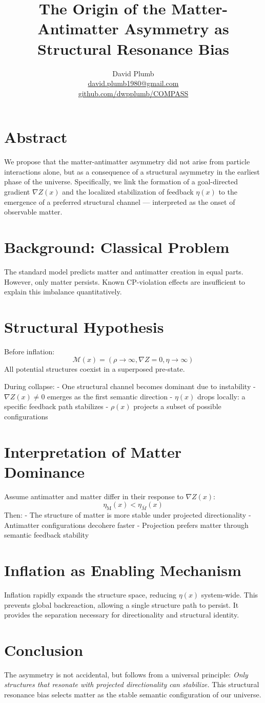 \documentclass[11pt]{article}
\title{The Origin of the Matter-Antimatter Asymmetry as Structural Resonance Bias}
\author{David Plumb \\ \href{mailto:david.plumb1980@gmail.com}{david.plumb1980@gmail.com} \\ \href{https://github.com/dwpplumb/COMPASS}{github.com/dwpplumb/COMPASS}}
\date{}
\begin{document}
\maketitle

\section*{Abstract}
We propose that the matter-antimatter asymmetry did not arise from particle interactions alone, but as a consequence of a structural asymmetry in the earliest phase of the universe. Specifically, we link the formation of a goal-directed gradient $\nabla Z(x)$ and the localized stabilization of feedback $\eta(x)$ to the emergence of a preferred structural channel — interpreted as the onset of observable matter.

\section{Background: Classical Problem}
The standard model predicts matter and antimatter creation in equal parts. However, only matter persists. Known CP-violation effects are insufficient to explain this imbalance quantitatively.

\section{Structural Hypothesis}
Before inflation:
\[
\mathcal{M}(x) = (\rho \to \infty, \nabla Z = 0, \eta \to \infty)
\]
All potential structures coexist in a superposed pre-state.

During collapse:
- One structural channel becomes dominant due to instability
- $\nabla Z(x) \ne 0$ emerges as the first semantic direction
- $\eta(x)$ drops locally: a specific feedback path stabilizes
- $\rho(x)$ projects a subset of possible configurations

\section{Interpretation of Matter Dominance}
Assume antimatter and matter differ in their response to $\nabla Z(x)$:
\[
\eta_\text{M}(x) < \eta_{\bar{M}}(x)
\]
Then:
- The structure of matter is more stable under projected directionality
- Antimatter configurations decohere faster
- Projection prefers matter through semantic feedback stability

\section{Inflation as Enabling Mechanism}
Inflation rapidly expands the structure space, reducing $\eta(x)$ system-wide. This prevents global backreaction, allowing a single structure path to persist. It provides the separation necessary for directionality and structural identity.

\section{Conclusion}
The asymmetry is not accidental, but follows from a universal principle: 
\textit{Only structures that resonate with projected directionality can stabilize.}
This structural resonance bias selects matter as the stable semantic configuration of our universe.
\end{document}
